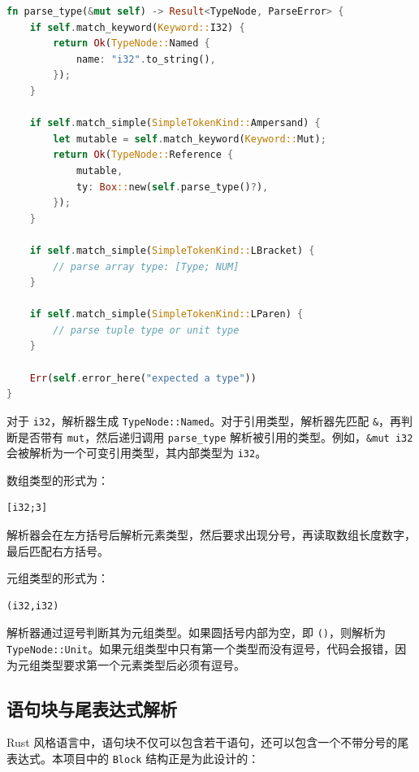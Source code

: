 \documentclass[UTF8,a4paper,12pt]{ctexart}
\begin{document}
\begin{lstlisting}[language=Rust,caption={类型解析函数结构示意}]
fn parse_type(&mut self) -> Result<TypeNode, ParseError> {
    if self.match_keyword(Keyword::I32) {
        return Ok(TypeNode::Named {
            name: "i32".to_string(),
        });
    }

    if self.match_simple(SimpleTokenKind::Ampersand) {
        let mutable = self.match_keyword(Keyword::Mut);
        return Ok(TypeNode::Reference {
            mutable,
            ty: Box::new(self.parse_type()?),
        });
    }

    if self.match_simple(SimpleTokenKind::LBracket) {
        // parse array type: [Type; NUM]
    }

    if self.match_simple(SimpleTokenKind::LParen) {
        // parse tuple type or unit type
    }

    Err(self.error_here("expected a type"))
}
\end{lstlisting}

对于 \texttt{i32}，解析器生成 \texttt{TypeNode::Named}。对于引用类型，解析器先匹配 \texttt{\&}，再判断是否带有 \texttt{mut}，然后递归调用 \texttt{parse\_type} 解析被引用的类型。例如，\texttt{\&mut i32} 会被解析为一个可变引用类型，其内部类型为 \texttt{i32}。

数组类型的形式为：

\begin{lstlisting}[caption={数组类型示例}]
[i32;3]
\end{lstlisting}

解析器会在左方括号后解析元素类型，然后要求出现分号，再读取数组长度数字，最后匹配右方括号。

元组类型的形式为：

\begin{lstlisting}[caption={元组类型示例}]
(i32,i32)
\end{lstlisting}

解析器通过逗号判断其为元组类型。如果圆括号内部为空，即 \texttt{()}，则解析为 \texttt{TypeNode::Unit}。如果元组类型中只有第一个类型而没有逗号，代码会报错，因为元组类型要求第一个元素类型后必须有逗号。

\subsection{语句块与尾表达式解析}

Rust 风格语言中，语句块不仅可以包含若干语句，还可以包含一个不带分号的尾表达式。本项目中的 \texttt{Block} 结构正是为此设计的：
\end{document}
